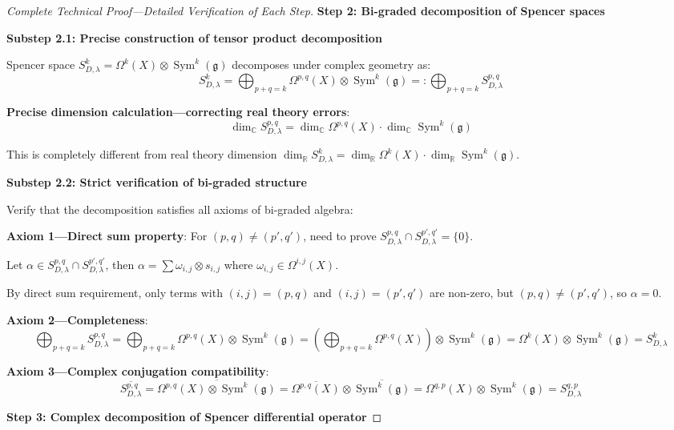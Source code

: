 \documentclass[a4paper,12pt]{extarticle}
\theoremstyle{definition}
\begin{document}
\begin{CJK}{UTF8}{gbsn}
\begin{proof}[Complete Technical Proof—Detailed Verification of Each Step]
\textbf{Step 2: Bi-graded decomposition of Spencer spaces}

\textbf{Substep 2.1: Precise construction of tensor product decomposition}

Spencer space $S^k_{D,\lambda} = \Omega^k(X) \otimes \operatorname{Sym}^k(\mathfrak{g})$ decomposes under complex geometry as:
$$S^k_{D,\lambda} = \bigoplus_{p+q=k} \Omega^{p,q}(X) \otimes \operatorname{Sym}^k(\mathfrak{g}) =: \bigoplus_{p+q=k} S^{p,q}_{D,\lambda}$$

\textbf{Precise dimension calculation—correcting real theory errors}:
$$\dim_{\mathbb{C}} S^{p,q}_{D,\lambda} = \dim_{\mathbb{C}} \Omega^{p,q}(X) \cdot \dim_{\mathbb{C}} \operatorname{Sym}^k(\mathfrak{g})$$

This is completely different from real theory dimension $\dim_{\mathbb{R}} S^k_{D,\lambda} = \dim_{\mathbb{R}} \Omega^k(X) \cdot \dim_{\mathbb{R}} \operatorname{Sym}^k(\mathfrak{g})$.

\textbf{Substep 2.2: Strict verification of bi-graded structure}

Verify that the decomposition satisfies all axioms of bi-graded algebra:

\textbf{Axiom 1—Direct sum property}:
For $(p,q) \neq (p',q')$, need to prove $S^{p,q}_{D,\lambda} \cap S^{p',q'}_{D,\lambda} = \{0\}$.

Let $\alpha \in S^{p,q}_{D,\lambda} \cap S^{p',q'}_{D,\lambda}$, then $\alpha = \sum \omega_{i,j} \otimes s_{i,j}$ where $\omega_{i,j} \in \Omega^{i,j}(X)$.

By direct sum requirement, only terms with $(i,j) = (p,q)$ and $(i,j) = (p',q')$ are non-zero, but $(p,q) \neq (p',q')$, so $\alpha = 0$.

\textbf{Axiom 2—Completeness}:
$$\bigoplus_{p+q=k} S^{p,q}_{D,\lambda} = \bigoplus_{p+q=k} \Omega^{p,q}(X) \otimes \operatorname{Sym}^k(\mathfrak{g}) = \left(\bigoplus_{p+q=k} \Omega^{p,q}(X)\right) \otimes \operatorname{Sym}^k(\mathfrak{g}) = \Omega^k(X) \otimes \operatorname{Sym}^k(\mathfrak{g}) = S^k_{D,\lambda}$$

\textbf{Axiom 3—Complex conjugation compatibility}:
$$\overline{S^{p,q}_{D,\lambda}} = \overline{\Omega^{p,q}(X) \otimes \operatorname{Sym}^k(\mathfrak{g})} = \overline{\Omega^{p,q}(X)} \otimes \overline{\operatorname{Sym}^k(\mathfrak{g})} = \Omega^{q,p}(X) \otimes \operatorname{Sym}^k(\mathfrak{g}) = S^{q,p}_{D,\lambda}$$

\textbf{Step 3: Complex decomposition of Spencer differential operator}


\end{proof}
\end{CJK}
\end{document}
